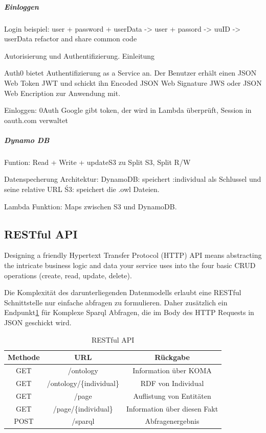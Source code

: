 \documentclass[
12pt,
english,
ngerman,
headsepline,
twoside,
openright,
numbers=noenddot,version=first
]{scrreprt}
\providecommand{\tabularnewline}{\\}
\begin{document}
\subparagraph{Einloggen}
Login beispiel: 
user + password + userData -> 
user + passord -> uuID -> userData 
refactor and share common code


Autorisierung und Authentifizierung. Einleitung

Auth0 bietet Authentifizierung as a Service an. Der Benutzer erhält einen JSON Web Token JWT und schickt ihn Encoded JSON Web Signature JWS oder JSON Web Encription zur Anwendung mit.


Einloggen: 0Auth Google gibt token, der wird in Lambda überprüft, Session in oauth.com verwaltet


\subparagraph{Dynamo DB}

Funtion: Read + Write + updateS3 
zu
Split S3, Split R/W 

Datenspecherung Architektur:
DynamoDB: speichert :individual als Schlussel und seine relative URL
Ś3: speichert die .owl Dateien.

Lambda Funktion: Maps zwischen S3 und DynamoDB.



\subsection{RESTful API}
\label{sec:rest}
Designing a friendly Hypertext Transfer Protocol (HTTP) API means abstracting the
intricate business logic and data your service uses into the four basic CRUD operations
(create, read, update, delete).

Die Komplexität des darunterliegenden Datenmodells erlaubt eine RESTful\cite{microAdv} Schnittstelle nur einfache abfragen zu formulieren. Daher zusätzlich ein Endpunkt\ref{tab:rest} für Komplexe Sparql Abfragen, die im Body des HTTP Requests in JSON geschickt wird. 

\begin{table}[H]
	\caption{RESTful API}\label{tab:rest}
	\noindent 
	\centering{}
	\begin{tabular}{ccc}
		\hline
		\noalign{\vskip\doublerulesep}
		Methode & URL & Rückgabe\tabularnewline[\doublerulesep]
		\hline
		\noalign{\vskip\doublerulesep}
		GET & /ontology & Information über KOMA
		\tabularnewline[\doublerulesep]\noalign{\vskip\doublerulesep}
		\noalign{\vskip\doublerulesep}
		GET & /ontology/\{individual\} & RDF von Individual
		\tabularnewline[\doublerulesep]\noalign{\vskip\doublerulesep}
		GET & /page & Auflistung von Entitäten 
		\tabularnewline[\doublerulesep]\noalign{\vskip\doublerulesep}
		GET & /page/\{individual\} & Information über diesen Fakt
		\tabularnewline[\doublerulesep]\noalign{\vskip\doublerulesep}
		POST & /sparql & Abfragenergebnis
		
	\end{tabular}
\end{table}
\end{document}
